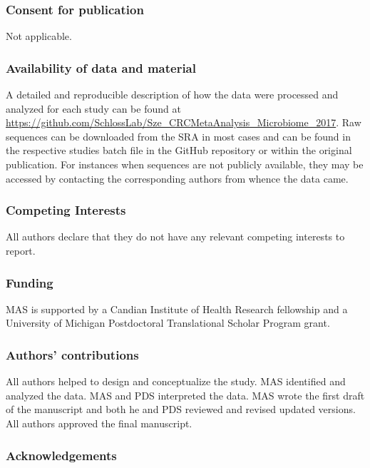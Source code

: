 \documentclass[12pt,]{article}
\begin{document}
\subsubsection{Consent for publication}\label{consent-for-publication}

Not applicable.

\subsubsection{Availability of data and
material}\label{availability-of-data-and-material}

A detailed and reproducible description of how the data were processed
and analyzed for each study can be found at
\url{https://github.com/SchlossLab/Sze_CRCMetaAnalysis_Microbiome_2017}.
Raw sequences can be downloaded from the SRA in most cases and can be
found in the respective studies batch file in the GitHub repository or
within the original publication. For instances when sequences are not
publicly available, they may be accessed by contacting the corresponding
authors from whence the data came.

\subsubsection{Competing Interests}\label{competing-interests}

All authors declare that they do not have any relevant competing
interests to report.

\subsubsection{Funding}\label{funding}

MAS is supported by a Candian Institute of Health Research fellowship
and a University of Michigan Postdoctoral Translational Scholar Program
grant.

\subsubsection{Authors' contributions}\label{authors-contributions}

All authors helped to design and conceptualize the study. MAS identified
and analyzed the data. MAS and PDS interpreted the data. MAS wrote the
first draft of the manuscript and both he and PDS reviewed and revised
updated versions. All authors approved the final manuscript.

\subsubsection{Acknowledgements}\label{acknowledgements}
\end{document}
